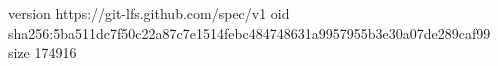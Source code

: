 version https://git-lfs.github.com/spec/v1
oid sha256:5ba511dc7f50c22a87c7e1514febc484748631a9957955b3e30a07de289caf99
size 174916
